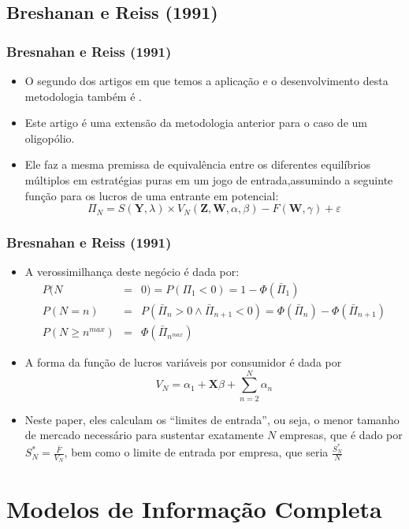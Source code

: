 \documentclass{beamer}
\begin{document}
\subsection{Breshanan e Reiss (1991)}
\begin{frame}\frametitle{Bresnahan e Reiss (1991)}

\begin{itemize}
\item O segundo dos artigos em que temos a aplicação e o desenvolvimento
desta metodologia também é \citet{Bresnahan1991a}. 
\item Este artigo é uma extensão da metodologia anterior para o caso de
um oligopólio. 
\item Ele faz a mesma premissa de equivalência entre os diferentes equilíbrios
múltiplos em estratégias puras em um jogo de entrada,assumindo a seguinte
função para os lucros de uma entrante em potencial:
\[
\Pi_{N}=S(\mathbf{Y},\lambda)\times V_{N}(\mathbf{Z},\mathbf{W},\alpha,\beta)-F(\mathbf{W},\gamma)+\varepsilon
\]
\end{itemize}
\end{frame}

\begin{frame}\frametitle{Bresnahan e Reiss (1991)}

\begin{itemize}
\item A verossimilhança deste negócio é dada por:
\begin{eqnarray*}
P(N & = & 0)=P(\Pi_{1}<0)=1-\Phi(\bar{\Pi}_{1})\\
P(N=n) & = & P(\bar{\Pi}_{n}>0\wedge\bar{\Pi}_{n+1}<0)=\Phi(\bar{\Pi}_{n})-\Phi(\bar{\Pi}_{n+1})\\
P(N\geq n^{max}) & = & \Phi(\bar{\Pi}_{n^{max}})
\end{eqnarray*}
\item A forma da função de lucros variáveis por consumidor é dada por 
\[
V_{N}=\alpha_{1}+\mathbf{X}\beta+\sum_{n=2}^{N}\alpha_{n}
\]
\item Neste paper, eles calculam os ``limites de entrada'', ou seja, o
menor tamanho de mercado necessário para sustentar exatamente $N$
empresas, que é dado por $S_{N}^{*}=\frac{\bar{F}}{V_{N}}$, bem como
o limite de entrada por empresa, que seria $\frac{S_{N}^{*}}{N}$
\end{itemize}
\end{frame}



\section{Modelos de Informação Completa}
\end{document}
